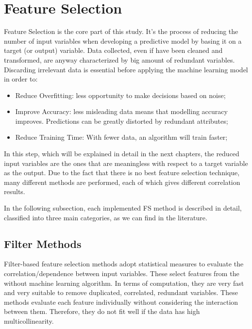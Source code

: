\section{Feature Selection}
Feature Selection is the core part of this study. It's the process of reducing the number of input variables when developing a predictive model by basing it on a target (or output) variable. 
Data collected, even if have been cleaned and transformed, are anyway characterized by big amount of redundant variables.
Discarding irrelevant data is essential before applying the machine learning model in order to:
\begin{itemize}
\item Reduce Overfitting: less opportunity to make decisions based on noise;
\item Improve Accuracy: less misleading data means that modelling accuracy improves. Predictions can be greatly distorted by redundant attributes;
\item Reduce Training Time: With fewer data, an algorithm will train faster;
\end{itemize}
In this step, which will be explained in detail in the next chapters, the reduced input variables are the ones that are meaningless with respect to a target variable as the output. \newline
Due to the fact that there is no best feature selection technique, many different methods are performed, each of which gives different correlation results.\par
In the following subsection, each implemented FS method is described in detail, classified into three main categories, as we can find in the literature\cite{stanczyk2015feature}.
\subsection{Filter Methods}
Filter-based feature selection methods adopt statistical measures to evaluate the correlation/dependence between input variables.\newline
These select features from the without machine learning algorithm. In terms of computation, they are very fast and very suitable to remove duplicated, correlated, redundant variables\cite{saeys2007review}. \newline
These methods evaluate each feature individually without considering the interaction between them. Therefore, they do not fit well if the data has high multicollinearity\cite{daoud2017multicollinearity}.


